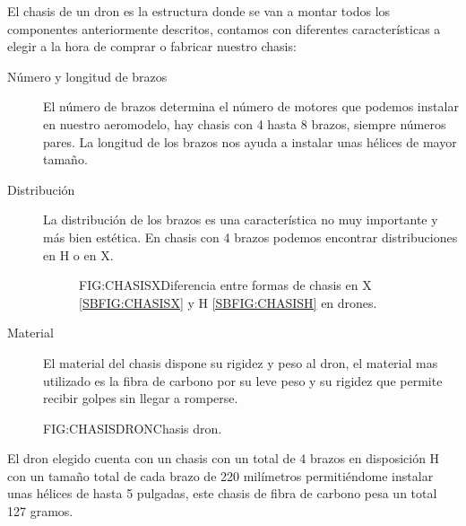 
	El chasis de un dron es la estructura donde se van a montar todos los componentes anteriormente descritos, contamos con diferentes características a elegir a la hora de comprar o fabricar nuestro chasis:
	
	\begin{description}
	\item[Número y longitud de brazos] El número de brazos determina el número de motores que podemos instalar en nuestro aeromodelo, hay chasis con 4 hasta 8 brazos, siempre números pares.
	La longitud de los brazos nos ayuda a instalar unas hélices de mayor tamaño.
	\item[Distribución] La distribución de los brazos es una característica no muy importante y más bien estética. En chasis con 4 brazos podemos encontrar distribuciones en H o en X.
	\begin{figure}[Chasis X y H]{FIG:CHASISX}{Diferencia entre formas de chasis en X \ref{SBFIG:CHASISX} y H \ref{SBFIG:CHASISH} en drones.}
	
   \quad
  
\end{figure} 
	\item[Material] El material del chasis dispone su rigidez y peso al dron, el material mas utilizado es la fibra de carbono por su leve peso y su rigidez que permite recibir golpes sin llegar a romperse.
	\end{description}
	
	\begin{figure}{FIG:CHASISDRON}{Chasis dron.}
\end{figure}	
		
	El dron elegido cuenta con un chasis con un total de 4 brazos en disposición H con un tamaño total de cada brazo de 220 milímetros permitiéndome instalar unas hélices de hasta 5 pulgadas, este chasis de fibra de carbono pesa un total 127 gramos.
	
	
